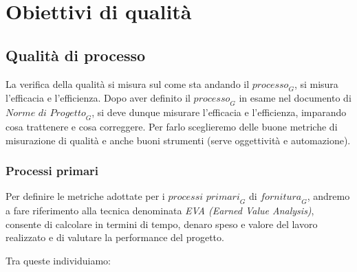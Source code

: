 \section{Obiettivi di qualità}

\subsection{Qualità di processo}
La verifica della qualità si misura sul come sta andando il $\textit{processo}_G$, si misura l'efficacia e l'efficienza.
Dopo aver definito il $\textit{processo}_G$ in esame nel documento di $\textit{Norme di Progetto}_G$, si deve dunque misurare l'efficacia e l'efficienza, imparando cosa trattenere e cosa correggere. Per farlo sceglieremo delle buone metriche di misurazione di qualità e anche buoni strumenti (serve oggettività e automazione).

\subsubsection{Processi primari}
Per definire le metriche adottate per i $\textit{processi primari}_G$ di $\textit{fornitura}_G$, andremo a fare riferimento alla tecnica denominata \emph{EVA (Earned Value Analysis)}, consente di calcolare in termini di tempo, denaro speso e valore del lavoro realizzato e di valutare la performance del progetto.

Tra queste individuiamo:


